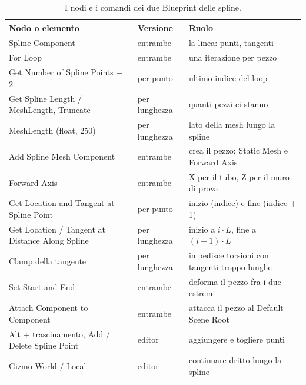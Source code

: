 \begin{table}[htbp]
\centering
\small
\begin{tabular}{@{}p{5.0cm}p{3.6cm}p{5.4cm}@{}}
\toprule
\textbf{Nodo o elemento} & \textbf{Versione} & \textbf{Ruolo} \\
\midrule
Spline Component & entrambe & la linea: punti, tangenti \\
For Loop & entrambe & una iterazione per pezzo \\
Get Number of Spline Points $-$ 2 & per punto & ultimo indice del loop \\
Get Spline Length / MeshLength, Truncate & per lunghezza & quanti pezzi ci stanno \\
MeshLength (float, 250) & per lunghezza & lato della mesh lungo la spline \\
Add Spline Mesh Component & entrambe & crea il pezzo; Static Mesh e Forward Axis \\
Forward Axis & entrambe & X per il tubo, Z per il muro di prova \\
Get Location and Tangent at Spline Point & per punto & inizio (indice) e fine
(indice + 1) \\
Get Location / Tangent at Distance Along Spline & per lunghezza & inizio a
$i \cdot L$, fine a $(i+1) \cdot L$ \\
Clamp della tangente & per lunghezza & impedisce torsioni con tangenti troppo lunghe \\
Set Start and End & entrambe & deforma il pezzo fra i due estremi \\
Attach Component to Component & entrambe & attacca il pezzo al Default Scene Root \\
Alt + trascinamento, Add / Delete Spline Point & editor & aggiungere e togliere punti \\
Gizmo World / Local & editor & continuare dritto lungo la spline \\
\bottomrule
\end{tabular}
\caption{I nodi e i comandi dei due Blueprint delle spline.}
\label{ue16:tab:spline}
\end{table}

